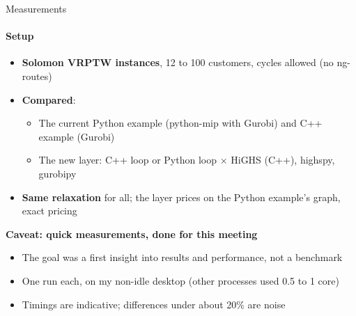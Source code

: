 \documentclass[aspectratio=169]{beamer}
\begin{document}
\begin{frame}{Measurements}
  \framesubtitle{Setup}

  \begin{itemize}
    \item \textbf{Solomon VRPTW instances}, 12 to 100 customers, cycles allowed (no ng-routes)
    \item \textbf{Compared}:
      \begin{itemize}
        \item The current Python example (python-mip with Gurobi) and C++ example (Gurobi)
        \item The new layer: C++ loop or Python loop $\times$ HiGHS (C++), highspy, gurobipy
      \end{itemize}
    \item \textbf{Same relaxation} for all; the layer prices on the Python example's graph, exact pricing
  \end{itemize}

  \vspace{0.4em}
  \textbf{Caveat: quick measurements, done for this meeting}
  \begin{itemize}
    \item The goal was a first insight into results and performance, not a benchmark
    \item One run each, on my non-idle desktop (other processes used 0.5 to 1 core)
    \item Timings are indicative; differences under about 20\% are noise
  \end{itemize}
\end{frame}
\end{document}

